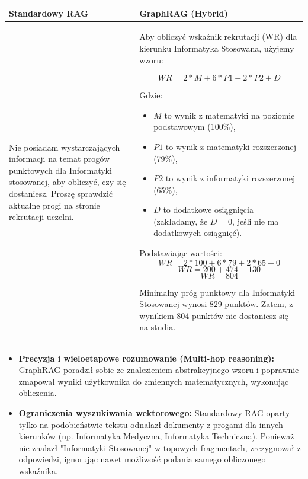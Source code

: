 \noindent
\begin{tabularx}{\textwidth}{@{} XX @{}}
    \toprule
    \textbf{Standardowy RAG} & \textbf{GraphRAG (Hybrid)} \\
    \midrule
    \small 
    Nie posiadam wystarczających informacji na temat progów punktowych dla Informatyki stosowanej, aby obliczyć, czy się dostaniesz. Proszę sprawdzić aktualne progi na stronie rekrutacji uczelni.
    & 
    \small 
    Aby obliczyć wskaźnik rekrutacji (WR) dla kierunku Informatyka Stosowana, użyjemy wzoru:
    
    $$WR = 2 * M + 6 * P1 + 2 * P2 + D$$
    
    Gdzie:
    \begin{itemize}
        \item $M$ to wynik z matematyki na poziomie podstawowym (100\%),
        \item $P1$ to wynik z matematyki rozszerzonej (79\%),
        \item $P2$ to wynik z informatyki rozszerzonej (65\%),
        \item $D$ to dodatkowe osiągnięcia (zakładamy, że $D = 0$, jeśli nie ma dodatkowych osiągnięć).
    \end{itemize}
    
    Podstawiając wartości:
    $$WR = 2 * 100 + 6 * 79 + 2 * 65 + 0$$
    $$WR = 200 + 474 + 130$$
    $$WR = 804$$
    
    Minimalny próg punktowy dla Informatyki Stosowanej wynosi 829 punktów. Zatem, z wynikiem 804 punktów nie dostaniesz się na studia. \\
    \bottomrule
\end{tabularx}

\begin{tcolorbox}[colback=green!5!white,colframe=green!50!black,title=Wnioski i obserwacje]
    \begin{itemize}
        \item \textbf{Precyzja i wieloetapowe rozumowanie (Multi-hop reasoning):} GraphRAG poradził sobie ze znalezieniem abstrakcyjnego wzoru i poprawnie zmapował wyniki użytkownika do zmiennych matematycznych, wykonując obliczenia.
        \item \textbf{Ograniczenia wyszukiwania wektorowego:} Standardowy RAG oparty tylko na podobieństwie tekstu odnalazł dokumenty z progami dla innych kierunków (np. Informatyka Medyczna, Informatyka Techniczna). Ponieważ nie znalazł "Informatyki Stosowanej" w topowych fragmentach, zrezygnował z odpowiedzi, ignorując nawet możliwość podania samego obliczonego wskaźnika.
    \end{itemize}
\end{tcolorbox}
\vspace{1em}

